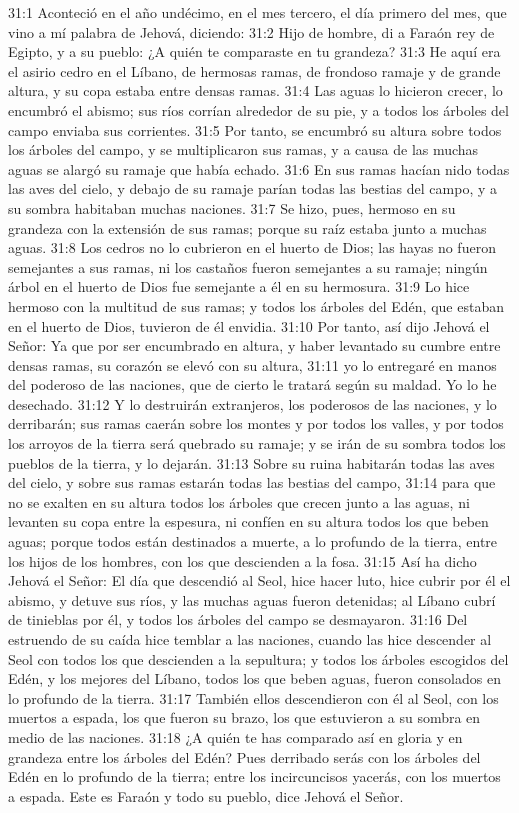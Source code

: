 31:1 Aconteció en el año undécimo, en el mes tercero, el día primero del mes, que vino a mí palabra de Jehová, diciendo:   
31:2 Hijo de hombre, di a Faraón rey de Egipto, y a su pueblo: ¿A quién te comparaste en tu grandeza?   
31:3 He aquí era el asirio cedro en el Líbano, de hermosas ramas, de frondoso ramaje y de grande altura, y su copa estaba entre densas ramas.   
31:4 Las aguas lo hicieron crecer, lo encumbró el abismo; sus ríos corrían alrededor de su pie, y a todos los árboles del campo enviaba sus corrientes.   
31:5 Por tanto, se encumbró su altura sobre todos los árboles del campo, y se multiplicaron sus ramas, y a causa de las muchas aguas se alargó su ramaje que había echado.   
31:6 En sus ramas hacían nido todas las aves del cielo, y debajo de su ramaje parían todas las bestias del campo, y a su sombra habitaban muchas naciones.   
31:7 Se hizo, pues, hermoso en su grandeza con la extensión de sus ramas; porque su raíz estaba junto a muchas aguas.   
31:8 Los cedros no lo cubrieron en el huerto de Dios;  las hayas no fueron semejantes a sus ramas, ni los castaños fueron semejantes a su ramaje; ningún árbol en el huerto de Dios fue semejante a él en su hermosura.   
31:9 Lo hice hermoso con la multitud de sus ramas; y todos los árboles del Edén, que estaban en el huerto de Dios, tuvieron de él envidia.   
31:10 Por tanto, así dijo Jehová el Señor: Ya que por ser encumbrado en altura, y haber levantado su cumbre entre densas ramas, su corazón se elevó con su altura,   
31:11 yo lo entregaré en manos del poderoso de las naciones, que de cierto le tratará según su maldad. Yo lo he desechado.   
31:12 Y lo destruirán extranjeros, los poderosos de las naciones, y lo derribarán; sus ramas caerán sobre los montes y por todos los valles, y por todos los arroyos de la tierra será quebrado su ramaje; y se irán de su sombra todos los pueblos de la tierra, y lo dejarán.   
31:13 Sobre su ruina habitarán todas las aves del cielo, y sobre sus ramas estarán todas las bestias del campo,   
31:14 para que no se exalten en su altura todos los árboles que crecen junto a las aguas, ni levanten su copa entre la espesura, ni confíen en su altura todos los que beben aguas; porque todos están destinados a muerte, a lo profundo de la tierra, entre los hijos de los hombres, con los que descienden a la fosa.   
31:15 Así ha dicho Jehová el Señor: El día que descendió al Seol, hice hacer luto, hice cubrir por él el abismo, y detuve sus ríos, y las muchas aguas fueron detenidas; al Líbano cubrí de tinieblas por él, y todos los árboles del campo se desmayaron.   
31:16 Del estruendo de su caída hice temblar a las naciones, cuando las hice descender al Seol con todos los que descienden a la sepultura; y todos los árboles escogidos del Edén, y los mejores del Líbano, todos los que beben aguas, fueron consolados en lo profundo de la tierra.   
31:17 También ellos descendieron con él al Seol, con los muertos a espada, los que fueron su brazo, los que estuvieron a su sombra en medio de las naciones. 
31:18 ¿A quién te has comparado así en gloria y en grandeza entre los árboles del Edén? Pues derribado serás con los árboles del Edén en lo profundo de la tierra; entre los incircuncisos yacerás, con los muertos a espada. Este es Faraón y todo su pueblo, dice Jehová el Señor.   
